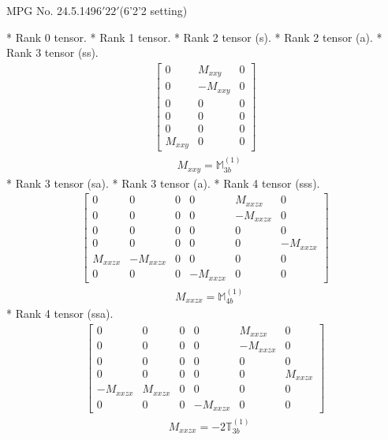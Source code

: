 \documentclass[fleqn,8pt,landscape]{jsarticle}
\begin{document}
\setcounter{MaxMatrixCols}{32}

\renewcommand{\tablename}{Table~}
\renewcommand{\figurename}{Figure~}
\begin{center}
\LARGE
MPG No. 24.5.149\quad$6'22'$\quad(6'2'2 setting)
\end{center}
* Rank 0 tensor.
* Rank 1 tensor.
* Rank 2 tensor (s).
* Rank 2 tensor (a).
* Rank 3 tensor (ss).
\begin{align*}
\begin{bmatrix} 0 & M_{xxy} & 0 \\ 0 & - M_{xxy} & 0 \\ 0 & 0 & 0 \\ 0 & 0 & 0 \\ 0 & 0 & 0 \\ M_{xxy} & 0 & 0 \end{bmatrix}
\end{align*}
\begin{align*}
& M_{xxy} = \mathbb{M}_{3b}^{(1)}
\end{align*}
* Rank 3 tensor (sa).
* Rank 3 tensor (a).
* Rank 4 tensor (sss).
\begin{align*}
\begin{bmatrix} 0 & 0 & 0 & 0 & M_{xxzx} & 0 \\ 0 & 0 & 0 & 0 & - M_{xxzx} & 0 \\ 0 & 0 & 0 & 0 & 0 & 0 \\ 0 & 0 & 0 & 0 & 0 & - M_{xxzx} \\ M_{xxzx} & - M_{xxzx} & 0 & 0 & 0 & 0 \\ 0 & 0 & 0 & - M_{xxzx} & 0 & 0 \end{bmatrix}
\end{align*}
\begin{align*}
& M_{xxzx} = \mathbb{M}_{4b}^{(1)}
\end{align*}
* Rank 4 tensor (ssa).
\begin{align*}
\begin{bmatrix} 0 & 0 & 0 & 0 & M_{xxzx} & 0 \\ 0 & 0 & 0 & 0 & - M_{xxzx} & 0 \\ 0 & 0 & 0 & 0 & 0 & 0 \\ 0 & 0 & 0 & 0 & 0 & M_{xxzx} \\ - M_{xxzx} & M_{xxzx} & 0 & 0 & 0 & 0 \\ 0 & 0 & 0 & - M_{xxzx} & 0 & 0 \end{bmatrix}
\end{align*}
\begin{align*}
& M_{xxzx} = - 2 \mathbb{T}_{3b}^{(1)}
\end{align*}
\end{document}
